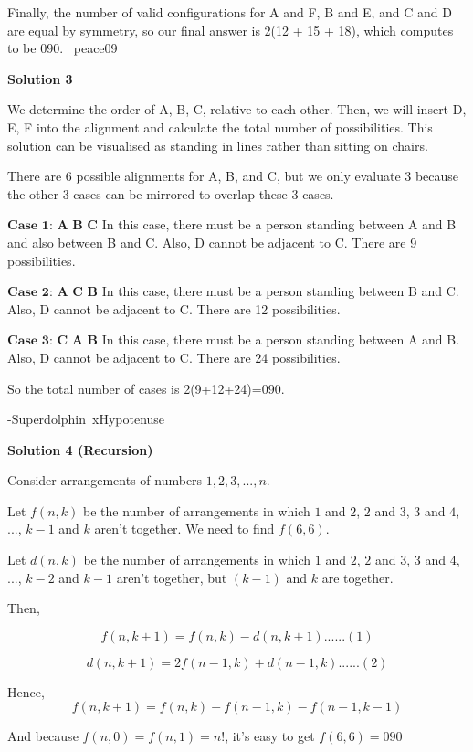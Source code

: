 \begin{enumerate}
 Finally, the number of valid configurations for A and F, B and E, and C and D are equal by symmetry, so our final answer is 2(12 + 15 + 18), which computes to be $\boxed{090}.$ ~peace09

 



\textbf{Solution 3}

We determine the order of A, B, C, relative to each other. Then, we will insert D, E, F into the alignment and calculate the total number of possibilities. This solution can be visualised as standing in lines rather than sitting on chairs.

 There are 6 possible alignments for A, B, and C, but we only evaluate 3 because the other 3 cases can be mirrored to overlap these 3 cases.

 $\textbf{Case 1: A B C}$ In this case, there must be a person standing between A and B and also between B and C. Also, D cannot be adjacent to C. There are 9 possibilities.

 $\textbf{Case 2: A C B}$ In this case, there must be a person standing between B and C. Also, D cannot be adjacent to C. There are 12 possibilities.

 $\textbf{Case 3: C A B}$ In this case, there must be a person standing between A and B. Also, D cannot be adjacent to C. There are 24 possibilities.

 So the total number of cases is 2(9+12+24)=$\boxed{090}$.

 -Superdolphin~xHypotenuse

 



\textbf{Solution 4 (Recursion)}

Consider arrangements of numbers $1, 2, 3, ..., n$.

 Let $f(n,k)$ be the number of arrangements in which $1$ and $2$, $2$ and $3$, $3$ and $4$, ..., $k-1$ and $k$ aren't together. We need to find $f(6,6)$.

 Let $d(n,k)$ be the number of arrangements in which $1$ and $2$, $2$ and $3$, $3$ and $4$, ..., $k-2$ and $k-1$ aren't together, but $(k-1)$ and $k$ are together.

 Then, 

 
 \[f(n,k+1) = f(n,k) - d(n,k+1)  ......(1)\]

 \[d(n,k+1) = 2f(n-1,k) + d(n-1,k)  ......(2)\]

 Hence,
 \[f(n,k+1)=f(n,k)-f(n-1,k)-f(n-1,k-1)\]

 And because $f(n,0) = f(n,1) = n!$, it's easy to get $f(6,6) = \boxed{090}$


\end{enumerate}
